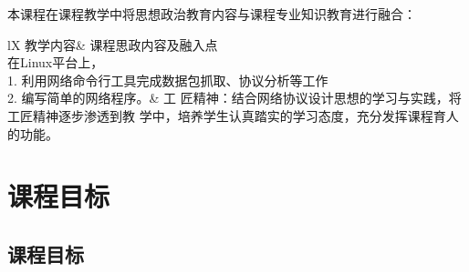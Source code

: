 \documentclass{swfusyllabus}
\begin{document}
本课程在课程教学中将思想政治教育内容与课程专业知识教育进行融合：

\begin{political}{lX}%
  教学内容& 课程思政内容及融入点\\
  {%
    在Linux平台上，\\
    1. 利用网络命令行工具完成数据包抓取、协议分析等工作\\
    2. 编写简单的网络程序。}& 工
  匠精神：结合网络协议设计思想的学习与实践，将工匠精神逐步渗透到教
  学中，培养学生认真踏实的学习态度，充分发挥课程育人的功能。\\
\end{political}

\section{课程目标}

       
      

\subsection{课程目标}
\end{document}
